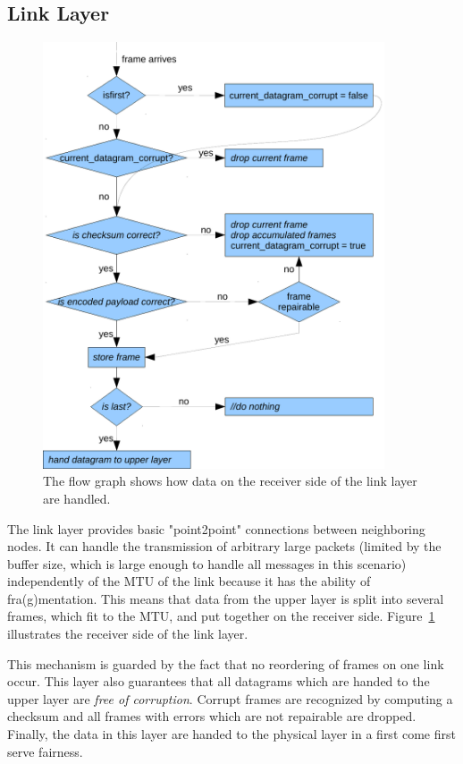 \subsection{Link Layer}
\begin{figure}
  \centering
  \includegraphics[width=0.9\textwidth]{images/flowgraph_link_layer_receiver.pdf}
  \caption[Receiver side of link layer]{ The flow graph shows how data on the receiver side of the link layer are handled.}
  \label{fig:receiver-side-link-layer}
\end{figure}
The link layer provides basic "point2point" connections between neighboring nodes. It can handle the transmission of arbitrary large packets (limited by the buffer size, which is large enough to handle all messages in this scenario) independently of the MTU of the link because it has the ability of fra(g)mentation. This means that data from the upper layer is split into several frames, which fit to the MTU, and put together on the receiver side. Figure~\ref{fig:receiver-side-link-layer} illustrates the receiver side of the link layer.

This mechanism is guarded by the fact that no reordering of frames on one link occur. This layer also guarantees that all datagrams which are handed to the upper layer are \emph{free of corruption}. Corrupt frames are recognized by computing a checksum and all frames with errors which are not repairable are dropped.  Finally, the data in this layer are handed to the physical layer in a first come first serve fairness. 

